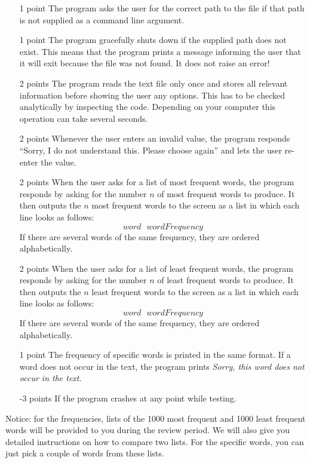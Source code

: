 \documentclass[11pt, leqno, a4paper]{article}
\begin{document}
\begin{itemize}
\item[1 point] The program asks the user for the correct path to the file if that path is not supplied as a command line argument.
\item[1 point] The program gracefully shuts down if the supplied path does not exist. This means that the program prints a message informing the user
that it will exit because the file was not found. It does not raise an error!
\item[2 points] The program reads the text file only once and stores all relevant information before showing the user any options. This has to
be checked analytically by inspecting the code. Depending on your computer this operation can take several seconds.
\item[2 points] Whenever the user enters an invalid value, the program responds ``Sorry, I do not understand this. Please choose again'' and lets the
user re-enter the value.
\item[2 points] When the user asks for a list of most frequent words, the program responds by asking for the number $ n $ of most frequent words to 
produce. It then outputs the $ n $ most frequent words to the screen as a list in which each line looks as follows:
$$ word~~~wordFrequency $$
If there are several words of the same frequency, they are ordered alphabetically.
\item[2 points] When the user asks for a list of least frequent words, the program responds by asking for the number $ n $ of least frequent words to 
produce. It then outputs the $ n $ least frequent words to the screen as a list in which each line looks as follows:
$$ word~~~wordFrequency $$
If there are several words of the same frequency, they are ordered alphabetically.
\item[1 point] The frequency of specific words is printed in the same format. If a word does not occur in the text, the program prints \textit{Sorry, this
word does not occur in the text}.
\item[-3 points] If the program crashes at any point while testing.
\end{itemize}

Notice: for the frequencies, lists of the 1000 most frequent and 1000 least frequent words will be provided to you during the review period. We will also give
you detailed instructions on how to compare two lists. For the specific words, you can just pick a couple of words from these lists.
\end{document}
